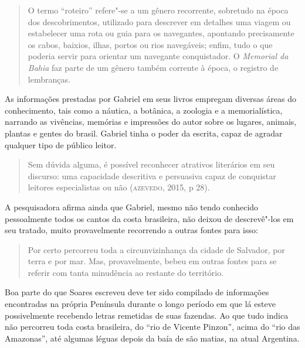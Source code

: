 \documentclass[12pt]{extarticle}
\begin{document}

\begin{quote}
O termo ``roteiro'' refere"-se a um gênero recorrente, sobretudo na época
dos descobrimentos, utilizado para descrever em detalhes uma viagem ou
estabelecer uma rota ou guia para os navegantes, apontando precisamente
os cabos, baixios, ilhas, portos ou rios navegáveis; enfim, tudo o que
poderia servir para orientar um navegante conquistador. O \textit{Memorial da
Bahia} faz parte de um gênero também corrente à época, o registro de
lembranças.
\end{quote}

As informações prestadas por Gabriel em seus livros empregam diversas
áreas do conhecimento, tais como a náutica, a botânica, a zoologia e a
memorialística, narrando as vivências, memórias e impressões do autor
sobre os lugares, animais, plantas e gentes do brasil. Gabriel tinha o
poder da escrita, capaz de agradar qualquer tipo de público leitor.

\begin{quote}
Sem dúvida alguma, é possível reconhecer atrativos literários em seu
discurso: uma capacidade descritiva e persuasiva capaz de conquistar
leitores especialistas ou não (\textsc{azevedo}, 2015, p 28).
\end{quote}

A pesquisadora afirma ainda que Gabriel, mesmo não tendo conhecido
pessoalmente todos os cantos da costa brasileira, não deixou de
descrevê"-los em seu tratado, muito provavelmente recorrendo a outras
fontes para isso:

\begin{quote}
Por certo percorreu toda a circunvizinhança da cidade de Salvador, por
terra e por mar. Mas, provavelmente, bebeu em outras fontes para se
referir com tanta minudência ao restante do território.
\end{quote}


Boa parte do que Soares escreveu deve ter sido compilado de informações
encontradas na própria Península durante o longo período em que lá
esteve possivelmente recebendo letras remetidas de suas fazendas. Ao que
tudo indica não percorreu toda costa brasileira, do ``rio de Vicente
Pinzon'', acima do ``rio das Amazonas'', até algumas léguas depois da
baía de são matias, na atual Argentina.
\end{document}
